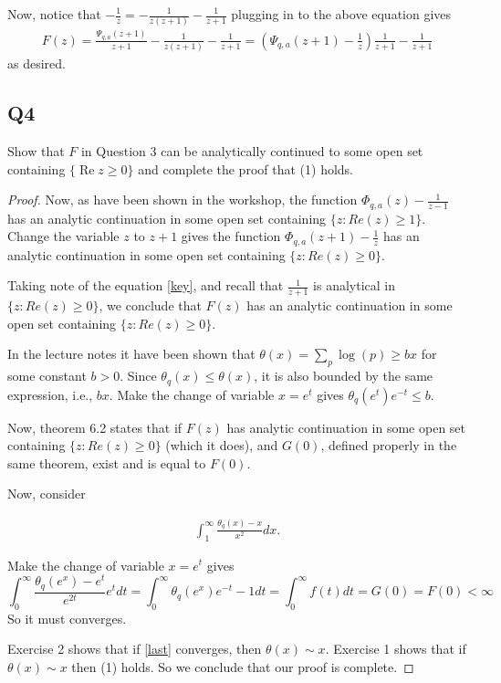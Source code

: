 \documentclass{article}
\theoremstyle{definition}
\theoremstyle{definition}
\theoremstyle{remark}
\begin{document}
Now, notice that $-\frac{1}{z} = - \frac{1}{z(z+1)} - \frac{1}{z+1}$
plugging in to the above equation gives
\begin{align}\label{key}
F(z) = \frac{\Psi_{q,a}(z + 1)}{z + 1} - \frac{1}{z(z+1)} - \frac{1}{z+1}  = \left(\Psi_{q,a}(z+1) - \frac{1}{z}\right)\frac{1}{z+1} - \frac{1}{z+1} \end{align} as desired.

\subsection*{Q4}

Show that $F$ in Question 3 can be analytically continued to some open set containing $\{\operatorname{Re} z \geq 0\}$ and complete the proof that (1) holds.

\begin{proof}
	Now, as have been shown in the workshop, the function $\Phi_{q,a}(z) - \frac{1}{z-1}$ has an analytic continuation in some open set containing $\{z: Re(z) \geq 1\}$. 
	Change the variable $z$ to $z+1$ gives the function $\Phi_{q,a}(z+1) - \frac{1}{z}$ has an analytic continuation in some open set containing $\{z: Re(z) \geq 0\}$.
		
	Taking note of the equation \eqref{key}, and recall that $\frac{1}{z+1}$ is analytical in $\{z: Re(z) \geq 0\}$, we conclude that $F(z)$ has an analytic continuation in some open set containing $\{z: Re(z) \geq 0\}$.

	In the lecture notes it have been shown that $\theta(x) = \sum_p \log(p) \geq bx$ for some constant $b > 0$. 
	Since $\theta_q(x) \leq \theta(x)$, it is also bounded by the same expression, i.e., $bx$. 
	Make the change of variable $x = e^t$ gives $\theta_q(e^t)e^{-t} \leq b$.

	Now, theorem 6.2 states that if $F(z)$ has analytic continuation in some open set containing $\{z: Re(z) \geq 0\}$ (which it does), and $G(0)$, defined properly in the same theorem, exist and is equal to $F(0)$. 

	Now, consider 

	\begin{align}\label{last}
		\int_1^{\infty} \frac{\theta_q(x) -x }{x^2}dx.
	\end{align}

	Make the change of variable $x = e^t$ gives 
	$$
		\int_0^{\infty} \frac{\theta_q(e^x) - e^t}{e^{2t}} e^t dt
		= \int_0^{\infty} \theta_q(e^x)e^{-t} - 1dt
		= \int_0^{\infty} f(t)dt = G(0) = F(0) < \infty
	$$
	So it must converges. 

	Exercise 2 shows that if \eqref{last} converges, then $\theta(x) \sim x$. 
	Exercise 1 shows that if $\theta(x) \sim x$ then (1) holds.
	So we conclude that our proof is complete.
\end{proof}
\end{document}
